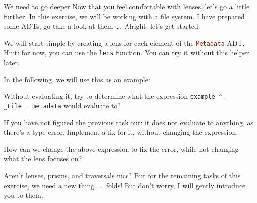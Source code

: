\documentclass{exercise}
\newcommand\h[2][]{\lstinline[language=haskell,#1]{#2}}
\begin{document}
	\begin{exercise}{We need to go deeper}
		Now that you feel comfortable with lenses, let's go a little further. In this
		exercise, we will be working with a file system. I have prepared some ADTs, go
		take a look at them~\ldots~Alright, let's get started.
		\begin{tasks}
			\item We will start simple by creating a lens for each element of the
				\h{Metadata} ADT. Hint: for now, you can use the \h{lens} function. You
				can try it without this helper later.
		\end{tasks}
		In the following, we will use this as an example:
		\begin{tasks}[resume*]
			\item Without evaluating it, try to determine what the expression \h{example ^.
				_File . metadata} would evaluate to?
			\item If you have not figured the previous task out: it does not evaluate to
				anything, as there's a type error. Implement a fix for it, without
				changing the expression.
			\item How can we change the above expression to fix the error, while not
				changing what the lens focuses on?
		\end{tasks}
		Aren't lenses, prisms, and traversals nice? But for the remaining tasks of this
		exercise, we need a new thing~\ldots~folds! But don't worry, I will gently introduce you to
		them.


\end{exercise}
\end{document}
